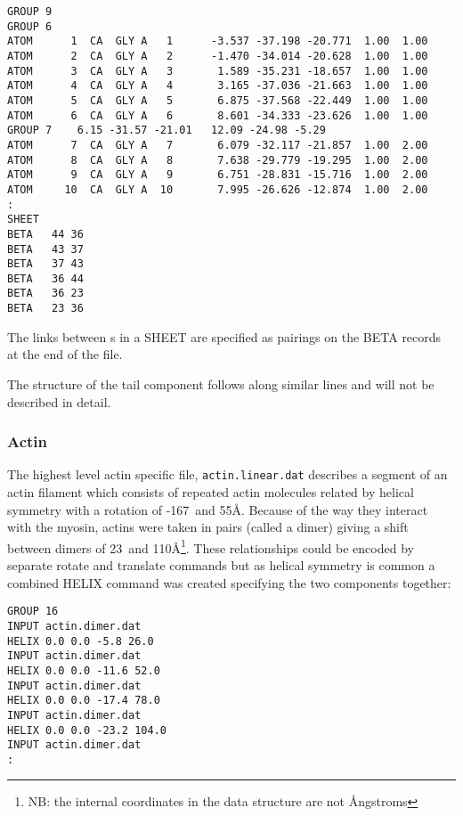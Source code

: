 \begin{singlespace}
\begin{verbatim}
GROUP 9
GROUP 6 
ATOM      1  CA  GLY A   1      -3.537 -37.198 -20.771  1.00  1.00
ATOM      2  CA  GLY A   2      -1.470 -34.014 -20.628  1.00  1.00
ATOM      3  CA  GLY A   3       1.589 -35.231 -18.657  1.00  1.00
ATOM      4  CA  GLY A   4       3.165 -37.036 -21.663  1.00  1.00
ATOM      5  CA  GLY A   5       6.875 -37.568 -22.449  1.00  1.00
ATOM      6  CA  GLY A   6       8.601 -34.333 -23.626  1.00  1.00
GROUP 7    6.15 -31.57 -21.01   12.09 -24.98 -5.29
ATOM      7  CA  GLY A   7       6.079 -32.117 -21.857  1.00  2.00
ATOM      8  CA  GLY A   8       7.638 -29.779 -19.295  1.00  2.00
ATOM      9  CA  GLY A   9       6.751 -28.831 -15.716  1.00  2.00
ATOM     10  CA  GLY A  10       7.995 -26.626 -12.874  1.00  2.00
:
SHEET
BETA   44 36
BETA   43 37
BETA   37 43
BETA   36 44
BETA   36 23
BETA   23 36
\end{verbatim}
\end{singlespace}

The links between \Bs s in a SHEET are specified as pairings on the BETA
records at the end of the file.

The structure of the tail component follows along similar lines and will not
be described in detail.

\subsubsection{Actin}

The highest level actin specific file, {\tt actin.linear.dat} describes a segment
of an actin filament which consists of repeated actin molecules related by helical
symmetry with a rotation of -167\degre\ and 55\AA.  Because of the way they interact
with the myosin, actins were taken in pairs (called a dimer) giving a shift between
dimers of 23\degre\ and 110\AA\footnote{
NB: the internal coordinates in the data structure are not \AA ngstroms}.  
These relationships could be encoded by separate 
rotate and translate commands but as helical symmetry is common a combined HELIX
command was created specifying the two components together:

\begin{singlespace}
\begin{verbatim}
GROUP 16
INPUT actin.dimer.dat
HELIX 0.0 0.0 -5.8 26.0
INPUT actin.dimer.dat
HELIX 0.0 0.0 -11.6 52.0
INPUT actin.dimer.dat
HELIX 0.0 0.0 -17.4 78.0
INPUT actin.dimer.dat
HELIX 0.0 0.0 -23.2 104.0
INPUT actin.dimer.dat
:
\end{verbatim}
\end{singlespace}

